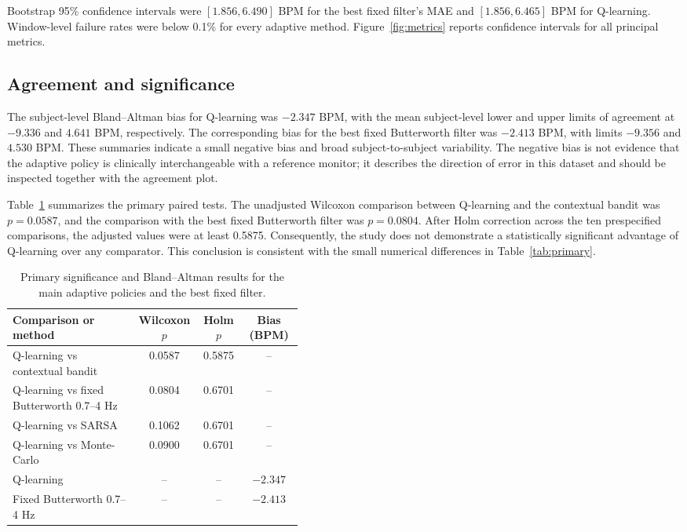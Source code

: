 \documentclass{elektr}
\begin{document}
Bootstrap 95\% confidence intervals were $[1.856,6.490]$ BPM for the
best fixed filter's MAE and $[1.856,6.465]$ BPM for Q-learning. Window-level
failure rates were below 0.1\% for every adaptive method. Figure~\ref{fig:metrics}
reports confidence intervals for all principal metrics.

\subsection{Agreement and significance}

The subject-level Bland--Altman bias for Q-learning was $-2.347$ BPM, with the mean subject-level lower and upper limits of agreement at $-9.336$ and $4.641$ BPM, respectively. The corresponding bias for the best fixed Butterworth filter was $-2.413$ BPM, with limits $-9.356$ and $4.530$ BPM. These summaries indicate a small negative bias and broad subject-to-subject variability. The negative bias is not evidence that the adaptive policy is clinically interchangeable with a reference monitor; it describes the direction of error in this dataset and should be inspected together with the agreement plot.

Table~\ref{tab:significance} summarizes the primary paired tests. The unadjusted Wilcoxon comparison between Q-learning and the contextual bandit was $p=0.0587$, and the comparison with the best fixed Butterworth filter was $p=0.0804$. After Holm correction across the ten prespecified comparisons, the adjusted values were at least 0.5875. Consequently, the study does not demonstrate a statistically significant advantage of Q-learning over any comparator. This conclusion is consistent with the small numerical differences in Table~\ref{tab:primary}.

\begin{table}[h!]
\caption{Primary significance and Bland--Altman results for the main adaptive policies and the best fixed filter.}
\label{tab:significance}
\begin{center}
\small
\begin{tabular}{p{0.43\linewidth}ccc}
\toprule
Comparison or method & Wilcoxon $p$ & Holm $p$ & Bias (BPM) \\
\midrule
Q-learning vs contextual bandit & 0.0587 & 0.5875 & -- \\
Q-learning vs fixed Butterworth 0.7--4 Hz & 0.0804 & 0.6701 & -- \\
Q-learning vs SARSA & 0.1062 & 0.6701 & -- \\
Q-learning vs Monte-Carlo & 0.0900 & 0.6701 & -- \\
Q-learning & -- & -- & $-2.347$ \\
Fixed Butterworth 0.7--4 Hz & -- & -- & $-2.413$ \\
\bottomrule
\end{tabular}
\end{center}
\vs{-4mm}
\end{table}
\end{document}
